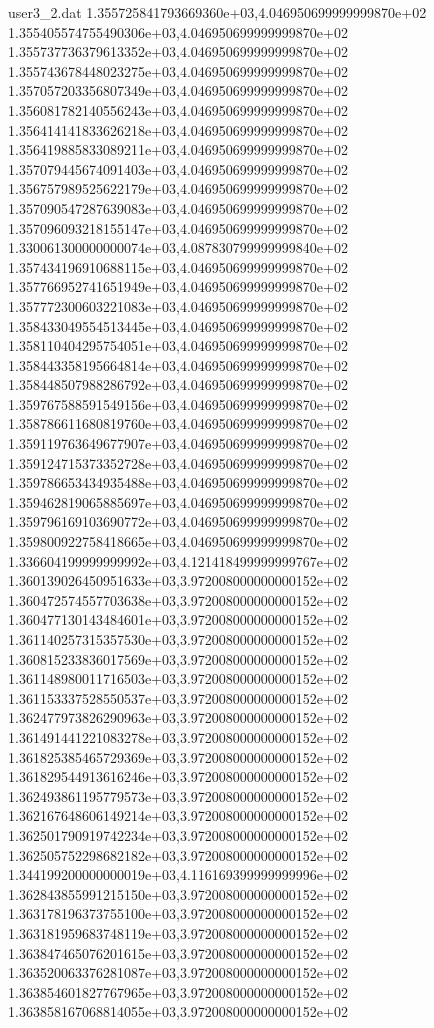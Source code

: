 \begin{filecontents}{user3_2.dat}
1.355725841793669360e+03,4.046950699999999870e+02
1.355405574755490306e+03,4.046950699999999870e+02
1.355737736379613352e+03,4.046950699999999870e+02
1.355743678448023275e+03,4.046950699999999870e+02
1.357057203356807349e+03,4.046950699999999870e+02
1.356081782140556243e+03,4.046950699999999870e+02
1.356414141833626218e+03,4.046950699999999870e+02
1.356419885833089211e+03,4.046950699999999870e+02
1.357079445674091403e+03,4.046950699999999870e+02
1.356757989525622179e+03,4.046950699999999870e+02
1.357090547287639083e+03,4.046950699999999870e+02
1.357096093218155147e+03,4.046950699999999870e+02
1.330061300000000074e+03,4.087830799999999840e+02
1.357434196910688115e+03,4.046950699999999870e+02
1.357766952741651949e+03,4.046950699999999870e+02
1.357772300603221083e+03,4.046950699999999870e+02
1.358433049554513445e+03,4.046950699999999870e+02
1.358110404295754051e+03,4.046950699999999870e+02
1.358443358195664814e+03,4.046950699999999870e+02
1.358448507988286792e+03,4.046950699999999870e+02
1.359767588591549156e+03,4.046950699999999870e+02
1.358786611680819760e+03,4.046950699999999870e+02
1.359119763649677907e+03,4.046950699999999870e+02
1.359124715373352728e+03,4.046950699999999870e+02
1.359786653434935488e+03,4.046950699999999870e+02
1.359462819065885697e+03,4.046950699999999870e+02
1.359796169103690772e+03,4.046950699999999870e+02
1.359800922758418665e+03,4.046950699999999870e+02
1.336604199999999992e+03,4.121418499999999767e+02
1.360139026450951633e+03,3.972008000000000152e+02
1.360472574557703638e+03,3.972008000000000152e+02
1.360477130143484601e+03,3.972008000000000152e+02
1.361140257315357530e+03,3.972008000000000152e+02
1.360815233836017569e+03,3.972008000000000152e+02
1.361148980011716503e+03,3.972008000000000152e+02
1.361153337528550537e+03,3.972008000000000152e+02
1.362477973826290963e+03,3.972008000000000152e+02
1.361491441221083278e+03,3.972008000000000152e+02
1.361825385465729369e+03,3.972008000000000152e+02
1.361829544913616246e+03,3.972008000000000152e+02
1.362493861195779573e+03,3.972008000000000152e+02
1.362167648606149214e+03,3.972008000000000152e+02
1.362501790919742234e+03,3.972008000000000152e+02
1.362505752298682182e+03,3.972008000000000152e+02
1.344199200000000019e+03,4.116169399999999996e+02
1.362843855991215150e+03,3.972008000000000152e+02
1.363178196373755100e+03,3.972008000000000152e+02
1.363181959683748119e+03,3.972008000000000152e+02
1.363847465076201615e+03,3.972008000000000152e+02
1.363520063376281087e+03,3.972008000000000152e+02
1.363854601827767965e+03,3.972008000000000152e+02
1.363858167068814055e+03,3.972008000000000152e+02

\end{filecontents}
